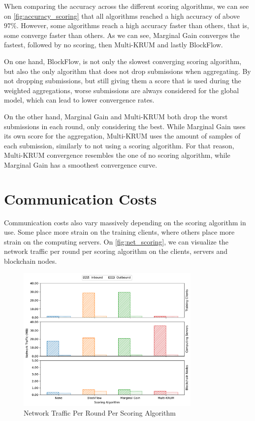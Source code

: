 When comparing the accuracy across the different scoring algorithms, we can see on \autoref{fig:accuracy_scoring} that all algorithms reached a high accuracy of above $97\%$. However, some algorithms reach a high accuracy faster than others, that is, some converge faster than others. As we can see, Marginal Gain converges the fastest, followed by no scoring, then Multi-KRUM and lastly BlockFlow.

On one hand, BlockFlow, is not only the slowest converging scoring algorithm, but also the only algorithm that does not drop submissions when aggregating. By not dropping submissions, but still giving them a score that is used during the weighted aggregations, worse submissions are always considered for the global model, which can lead to lower convergence rates. 

On the other hand, Marginal Gain and Multi-KRUM both drop the worst submissions in each round, only considering the best. While Marginal Gain uses its own score for the aggregation, Multi-KRUM uses the amount of samples of each submission, similarly to not using a scoring algorithm. For that reason, Multi-KRUM convergence resembles the one of no scoring algorithm, while Marginal Gain has a smoothest convergence curve.

\section{Communication Costs}

Communication costs also vary massively depending on the scoring algorithm in use. Some place more strain on the training clients, where others place more strain on the computing servers. On \autoref{fig:net_scoring}, we can visualize the network traffic per round per scoring algorithm on the clients, servers and blockchain nodes.

\begin{figure}[!ht]
    \centering
    \centering
    \includegraphics[width=0.8\textwidth]{graphics/scoring/net.pdf}
    \caption{Network Traffic Per Round Per Scoring Algorithm}
    \label{fig:net_scoring}
\end{figure}


